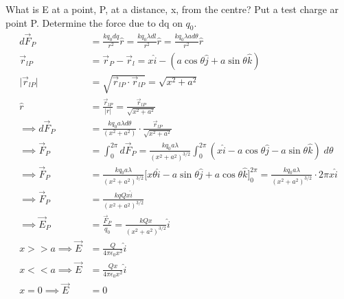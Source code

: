 \documentclass[a4paper, 11pt, normalem]{report}
\begin{document}
What is E at a point, P, at a distance, x, from the centre?
Put a test charge ar point P.
Determine the force due to dq on $q_{0}$.
\begin{align}
    d\vec{F}_{P} &= \frac{kq_{0}dq}{r^{2}} \hat{r} = \frac{kq_{0}\lambda dl}{r^{2}} \hat{r} = \frac{kq_{0}\lambda a d\theta}{r^{2}} \hat{r} \\
    \vec{r}_{lP} &= \vec{r}_{P} - \vec{r}_{l} = x \hat{i} - (a\cos\theta \hat{j} + a\sin\theta \hat{k}) \\
    \big|\vec{r}_{lP}\big| &= \sqrt{\vec{r}_{lP} \cdot \vec{r}_{lP}} = \sqrt{x^{2} + a^{2}} \\
    \hat{r} &= \frac{\vec{r}_{lP}}{|r|} = \frac{\vec{r}_{lP}}{\sqrt{x^{2} + a^{2}}} \\
    \implies d\vec{F}_{P} &= \frac{k q_{0} a \lambda d\theta}{(x^{2} + a^{2})} \cdot \frac{\vec{r}_{lP}}{\sqrt{x^{2} + a^{2}}} \\
    \implies \vec{F}_{P} &= \int_{0}^{2\pi} d\vec{F}_{P} = \frac{k q_{0} a \lambda}{(x^{2} + a^{2})^{3/2}} \int_{0}^{2\pi} (x \hat{i} - a\cos\theta \hat{j} - a\sin\theta \hat{k}) \; d\theta \\
    \implies \vec{F}_{P} &= \frac{k q_{0} a \lambda}{(x^{2} + a^{2})^{3/2}} \big[x\theta \hat{i} - a\sin\theta \hat{j} + a\cos\theta \hat{k} \big]_{0}^{2\pi} = \frac{k q_{0} a \lambda}{(x^{2} + a^{2})^{3/2}} \cdot 2\pi x \hat{i} \\
    \implies \vec{F}_{P} &= \frac{k q Q x \hat{i}}{(x^{2} + a^{2})^{3/2}} \\
    \implies \vec{E}_{P} &= \frac{\vec{F}_{P}}{q_{0}} = \frac{k Q x}{(x^{2} + a^{2})^{3/2}} \hat{i} \\
    x >> a \implies \vec{E} &= \frac{Q}{4\pi\epsilon_{0}x^{2}} \hat{i} \\
    x << a \implies \vec{E} &= \frac{Q x}{4\pi\epsilon_{0}x^{2}} \hat{i} \\
    x = 0 \implies \vec{E} &= 0
\end{align}

\chapter{}
\end{document}
